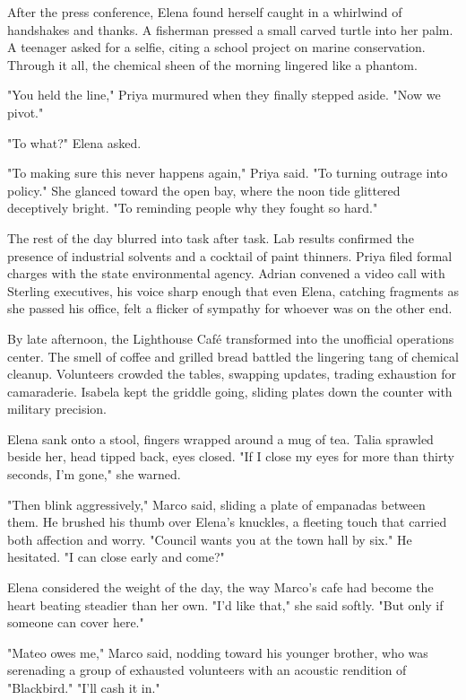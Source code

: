 After the press conference, Elena found herself caught in a whirlwind of handshakes and thanks. A fisherman pressed a small carved turtle into her palm. A teenager asked for a selfie, citing a school project on marine conservation. Through it all, the chemical sheen of the morning lingered like a phantom.

"You held the line," Priya murmured when they finally stepped aside. "Now we pivot."

"To what?" Elena asked.

"To making sure this never happens again," Priya said. "To turning outrage into policy." She glanced toward the open bay, where the noon tide glittered deceptively bright. "To reminding people why they fought so hard."

The rest of the day blurred into task after task. Lab results confirmed the presence of industrial solvents and a cocktail of paint thinners. Priya filed formal charges with the state environmental agency. Adrian convened a video call with Sterling executives, his voice sharp enough that even Elena, catching fragments as she passed his office, felt a flicker of sympathy for whoever was on the other end.

By late afternoon, the Lighthouse Café transformed into the unofficial operations center. The smell of coffee and grilled bread battled the lingering tang of chemical cleanup. Volunteers crowded the tables, swapping updates, trading exhaustion for camaraderie. Isabela kept the griddle going, sliding plates down the counter with military precision.

Elena sank onto a stool, fingers wrapped around a mug of tea. Talia sprawled beside her, head tipped back, eyes closed. "If I close my eyes for more than thirty seconds, I'm gone," she warned.

"Then blink aggressively," Marco said, sliding a plate of empanadas between them. He brushed his thumb over Elena's knuckles, a fleeting touch that carried both affection and worry. "Council wants you at the town hall by six." He hesitated. "I can close early and come?"

Elena considered the weight of the day, the way Marco's cafe had become the heart beating steadier than her own. "I'd like that," she said softly. "But only if someone can cover here."

"Mateo owes me," Marco said, nodding toward his younger brother, who was serenading a group of exhausted volunteers with an acoustic rendition of "Blackbird." "I'll cash it in."

